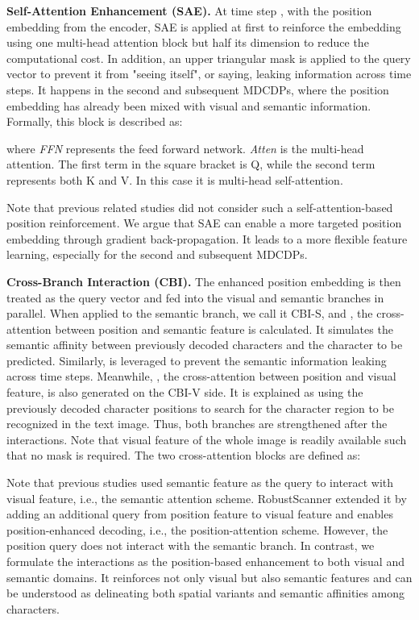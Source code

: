 \noindent\textbf{Self-Attention Enhancement (SAE).}
At time step , with the position embedding  from the encoder, SAE is applied at first to reinforce the embedding using one multi-head attention block \citep{vaswani2017transformer} but half its dimension to reduce the computational cost. In addition, an upper triangular mask  is applied to the query vector to prevent it from "seeing itself", or saying, leaking information across time steps. It happens in the second and subsequent MDCDPs, where the position embedding has already been mixed with visual and semantic information. Formally, this block is described as:

\noindent where \emph{FFN} represents the feed forward network. \emph{Atten} is the multi-head attention. The first term in the square bracket is Q, while the second term represents both K and V. In this case it is multi-head self-attention.

Note that previous related studies \citep{ABInet21CVPR,SRNyu2020towards} did not consider such a self-attention-based position reinforcement. We argue that SAE can enable a more targeted position embedding through gradient back-propagation. It leads to a more flexible feature learning, especially for the second and subsequent MDCDPs. 

\noindent\textbf{Cross-Branch Interaction (CBI).} 
The enhanced position embedding  is then treated as the query vector and fed into the visual and semantic branches in parallel. When applied to the semantic branch, we call it CBI-S, and , the cross-attention between position and semantic feature is calculated. It simulates the semantic affinity between previously decoded characters and the character to be predicted. Similarly,  is leveraged to prevent the semantic information leaking across time steps. Meanwhile, , the cross-attention between position and visual feature, is also generated on the CBI-V side. It is explained as using the previously decoded character positions to search for the character region to be recognized in the text image. Thus, both branches are strengthened after the interactions. Note that visual feature of the whole image is readily available such that no mask is required. The two cross-attention blocks are defined as:


Note that previous studies \citep{Baekwhats_wrong_19ICCV,li2019sar} used semantic feature as the query to interact with visual feature, i.e., the semantic attention scheme. RobustScanner \citep{yue2020robustscanner} extended it by adding an additional query from position feature to visual feature and enables position-enhanced decoding, i.e., the position-attention scheme. However, the position query does not interact with the semantic branch. In contrast, we formulate the interactions as the position-based enhancement to both visual and semantic domains. It reinforces not only visual but also semantic features and can be understood as delineating both spatial variants and semantic affinities among characters.

